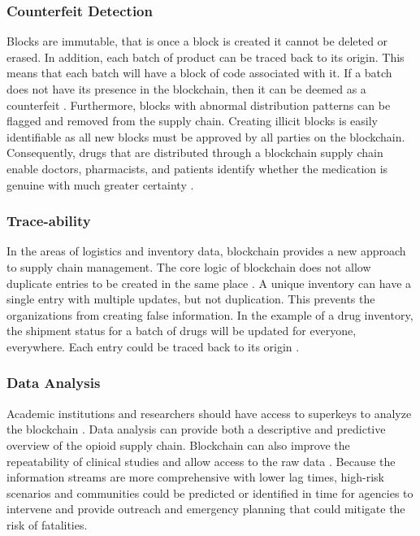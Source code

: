 \documentclass[sigconf]{acmart}
\begin{document}
\subsubsection{Counterfeit Detection} Blocks are immutable, that is once a block is created it cannot be deleted or erased. In addition, each batch of product can be traced back to its origin. This means that each batch will have a block of code associated with it. If a batch does not have its presence in the blockchain, then it can be deemed as a counterfeit \cite{arbc2}. Furthermore, blocks with abnormal distribution patterns can be flagged and removed from the supply chain. Creating illicit blocks is easily identifiable as all new blocks must be approved by all parties on the blockchain. Consequently, drugs that are distributed through a blockchain supply chain enable doctors, pharmacists, and patients identify whether the medication is genuine with much greater certainty \cite{hitchingHealthcare}.

\subsubsection{Trace-ability} In the areas of logistics and inventory data, blockchain provides a new approach to supply chain management. The core logic of blockchain does not allow duplicate entries to be created in the same place \cite{arbc4}. A unique inventory can have a single entry with multiple updates, but not duplication. This prevents the organizations from creating false information. In the example of a drug inventory, the shipment status for a batch of drugs will be updated for everyone, everywhere. Each entry could be traced back to its origin \cite{arbc4}.

\subsubsection{Data Analysis} Academic institutions and researchers should have access to superkeys to analyze the blockchain \cite{arbc5}. Data analysis can provide both a descriptive and predictive overview of the opioid supply chain. Blockchain can also improve the repeatability of clinical studies and allow access to the raw data \cite{Benchoufi01}. Because the information streams are more comprehensive with lower lag times, high-risk scenarios and communities could be predicted or identified in time for agencies to intervene and provide outreach and emergency planning that could mitigate the risk of fatalities. 
\end{document}

